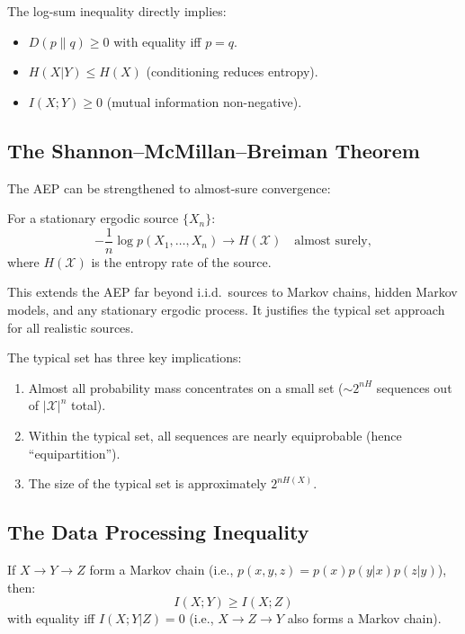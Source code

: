 The log-sum inequality directly implies:
\begin{itemize}
\item $D(p\|q) \ge 0$ with equality iff $p=q$.
\item $H(X|Y) \le H(X)$ (conditioning reduces entropy).
\item $I(X;Y) \ge 0$ (mutual information non-negative).
\end{itemize}

\subsection{The Shannon--McMillan--Breiman Theorem}

The AEP can be strengthened to almost-sure convergence:

\begin{theorem}
For a stationary ergodic source $\{X_n\}$:
\[
-\frac{1}{n}\log p(X_1,\dots,X_n) \to H(\mathcal{X}) \quad \text{almost surely},
\]
where $H(\mathcal{X})$ is the entropy rate of the source.
\end{theorem}

This extends the AEP far beyond i.i.d.\ sources to Markov chains, hidden Markov models, and any stationary ergodic process. It justifies the typical set approach for all realistic sources.

The typical set has three key implications:
\begin{enumerate}
\item Almost all probability mass concentrates on a small set ($\sim 2^{nH}$ sequences out of $|\mathcal{X}|^n$ total).
\item Within the typical set, all sequences are nearly equiprobable (hence ``equipartition'').
\item The size of the typical set is approximately $2^{nH(X)}$.
\end{enumerate}

\subsection{The Data Processing Inequality}
\label{sec:information:dpi}

\begin{theorem}
If $X \to Y \to Z$ form a Markov chain (i.e., $p(x,y,z) = p(x)p(y|x)p(z|y)$), then:
\[
I(X;Y) \ge I(X;Z)
\]
with equality iff $I(X;Y|Z) = 0$ (i.e., $X \to Z \to Y$ also forms a Markov chain).
\end{theorem}

